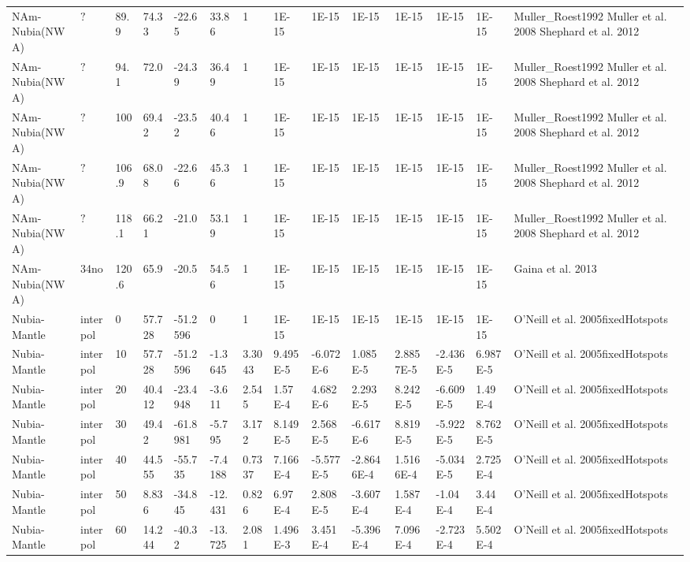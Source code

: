 \begin{landscape}
\begin{longtable}{@{}lllllllllllllp{3.5cm}@{}}
NAm-Nubia(NWA) & $\mathord{?}$ & 89.9 & 74.33 & -22.65 & 33.86 & 1 & 1E-15 & 1E-15 & 1E-15 & 1E-15 & 1E-15 & 1E-15 & Muller\_Roest1992 Muller et al. 2008 Shephard et al. 2012 \\
NAm-Nubia(NWA) & $\mathord{?}$ & 94.1 & 72.0 & -24.39 & 36.49 & 1 & 1E-15 & 1E-15 & 1E-15 & 1E-15 & 1E-15 & 1E-15 & Muller\_Roest1992 Muller et al. 2008 Shephard et al. 2012 \\
NAm-Nubia(NWA) & $\mathord{?}$ & 100 & 69.42 & -23.52 & 40.46 & 1 & 1E-15 & 1E-15 & 1E-15 & 1E-15 & 1E-15 & 1E-15 & Muller\_Roest1992 Muller et al. 2008 Shephard et al. 2012 \\
NAm-Nubia(NWA) & $\mathord{?}$ & 106.9 & 68.08 & -22.66 & 45.36 & 1 & 1E-15 & 1E-15 & 1E-15 & 1E-15 & 1E-15 & 1E-15 & Muller\_Roest1992 Muller et al. 2008 Shephard et al. 2012 \\
NAm-Nubia(NWA) & $\mathord{?}$ & 118.1 & 66.21 & -21.0 & 53.19 & 1 & 1E-15 & 1E-15 & 1E-15 & 1E-15 & 1E-15 & 1E-15 & Muller\_Roest1992 Muller et al. 2008 Shephard et al. 2012 \\
NAm-Nubia(NWA) & 34no & 120.6 & 65.9 & -20.5 & 54.56 & 1 & 1E-15 & 1E-15 & 1E-15 & 1E-15 & 1E-15 & 1E-15 & Gaina et al. 2013 \\
Nubia-Mantle & interpol & 0 & 57.728 & -51.2596 & 0 & 1 & 1E-15 & 1E-15 & 1E-15 & 1E-15 & 1E-15 & 1E-15 & O'Neill et al. 2005fixedHotspots \\
Nubia-Mantle & interpol & 10 & 57.728 & -51.2596 & -1.3645 & 3.3043 & 9.495E-5 & -6.072E-6 & 1.085E-5 & 2.8857E-5 & -2.436E-5 & 6.987E-5 & O'Neill et al. 2005fixedHotspots \\
Nubia-Mantle & interpol & 20 & 40.412 & -23.4948 & -3.611 & 2.545 & 1.57E-4 & 4.682E-6 & 2.293E-5 & 8.242E-5 & -6.609E-5 & 1.49E-4 & O'Neill et al. 2005fixedHotspots \\
Nubia-Mantle & interpol & 30 & 49.42 & -61.8981 & -5.795 & 3.172 & 8.149E-5 & 2.568E-5 & -6.617E-6 & 8.819E-5 & -5.922E-5 & 8.762E-5 & O'Neill et al. 2005fixedHotspots \\
Nubia-Mantle & interpol & 40 & 44.555 & -55.735 & -7.4188 & 0.7337 & 7.166E-4 & -5.577E-5 & -2.8646E-4 & 1.5166E-4 & -5.034E-5 & 2.725E-4 & O'Neill et al. 2005fixedHotspots \\
Nubia-Mantle & interpol & 50 & 8.836 & -34.845 & -12.431 & 0.826 & 6.97E-4 & 2.808E-5 & -3.607E-4 & 1.587E-4 & -1.04E-4 & 3.44E-4 & O'Neill et al. 2005fixedHotspots \\
Nubia-Mantle & interpol & 60 & 14.244 & -40.32 & -13.725 & 2.081 & 1.496E-3 & 3.451E-4 & -5.396E-4 & 7.096E-4 & -2.723E-4 & 5.502E-4 & O'Neill et al. 2005fixedHotspots \\

\end{longtable}
\end{landscape}

